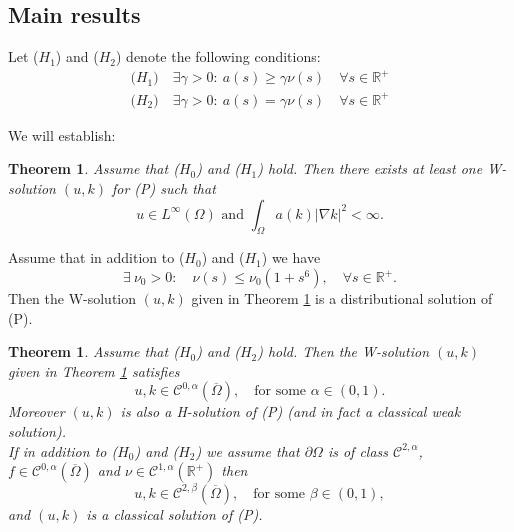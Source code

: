 \documentclass{elsart}
\newtheorem{theo}[defi]{Theorem}
\begin{document}
\subsection{Main results}

Let ($H_1$) and ($H_2$) denote the following conditions:
$$ 
\begin{array}{l}
\text{(}H_1\text{)}\quad \exists \gamma > 0 : \ a(s) \geq \gamma
  \nu(s) \quad \forall s \in \mathbb R^{+} \\ 
\text{(}H_2\text{)}\quad \exists \gamma > 0 : \ a(s) = \gamma
  \nu(s) \quad \forall s \in \mathbb R^{+}
\end{array}
$$

We will establish: 

\begin{theo}\label{theo1}
Assume that ($H_0$) and ($H_1$) hold. Then there exists at least one 
W-solution $(u,k)$ for (P) such that  
\begin{equation}
u\in L^{\infty}(\Omega) \text{ and } 
\int_{\Omega}a(k)|\nabla k|^2 < \infty. \label{reg1}
\end{equation}
\end{theo}

\begin{cor}\label{cor1}
Assume that in addition to ($H_0$) and ($H_1$) we have 
\begin{equation}
\exists \ \nu_0 > 0: \quad \nu(s) \leq \nu_0(1 + s^6), \quad \forall
s \in \mathbb R^{+}. \label{cocor1}
\end{equation}
Then the W-solution $(u,k)$ given in Theorem \ref{theo1} is a 
distributional solution of (P).
\end{cor}

\begin{theo}\label{theo2}
Assume that ($H_0$) and ($H_2$) hold. Then the W-solution $(u,k)$ given in 
Theorem \ref{theo1} satisfies 
\begin{equation} 
u,k \in \mathcal{C}^{0,\alpha}(\overline{\Omega}), \quad 
\text{for some } \alpha \in (0,1). \label{reg2}
\end{equation}
Moreover $(u,k)$ is also a H-solution of (P) (and in fact a classical
weak solution). \\ 
If in addition to ($H_0$) and ($H_2$) we assume that 
$\partial \Omega$ is of class
$\mathcal{C}^{2,\alpha}$, $f \in
\mathcal{C}^{0,\alpha}(\overline{\Omega})$ and $\nu \in
\mathcal{C}^{1,\alpha}(\mathbb R^{+})$ then 
$$u,k \in \mathcal{C}^{2,\beta}(\overline{\Omega}), \quad 
\text{for some } \beta \in (0,1),$$
and $(u,k)$ is a classical solution of (P).
\end{theo}
\end{document}
